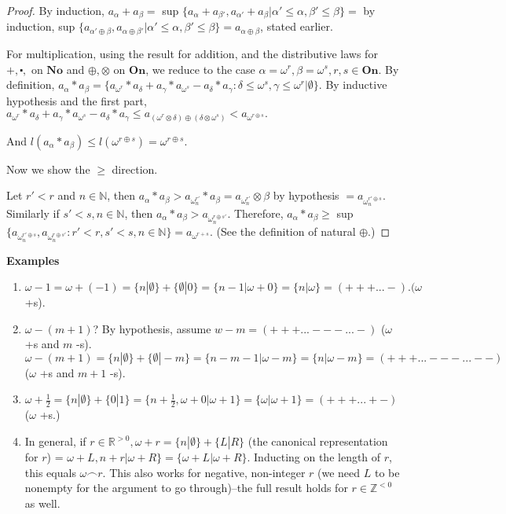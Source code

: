 \begin{proof} %

By induction, $a_\alpha + a_\beta =$ sup $\{a_\alpha + a_{\beta'}, a_{\alpha'} + a_\beta | \alpha' \leq \alpha, \beta' \leq \beta \}  =$ by induction, sup $\{a_{\alpha' \oplus \beta}, a_{\alpha \oplus \beta'} | \alpha' \leq \alpha, \beta' \leq \beta \} = a_{\alpha \oplus \beta}$, stated earlier.

For multiplication, using the result for addition, and the distributive laws for $+, \centerdot,$ on $\mathbf{No}$ and $\oplus, \otimes$ on $\mathbf{On}$, we reduce to the case $\alpha = \omega^r, \beta= \omega^s, r, s \in \mathbf{On}$. By definition, $a_\alpha * a_\beta = \{a_{\omega^r} * a_\delta + a_{\gamma}*a_{\omega^s} - a_{\delta}*a_{\gamma} : \delta \leq \omega^s, \gamma \leq \omega^r | \emptyset \}.$ %
By inductive hypothesis and the first part, $a_{\omega^r} * a_\delta + a_{\gamma}*a_{\omega^s} - a_{\delta}*a_{\gamma} \leq a_{(\omega^r \otimes \delta) \oplus (\delta \otimes \omega^s)} < a_{\omega^{r \oplus s}}.$

And $l(a_\alpha * a_\beta) \leq l(\omega^{r \oplus s}) = \omega^{r \oplus s}$.

Now we show the $\geq$ direction.

Let $r'<r$ and $n \in \mathbb{N}$, then $a_\alpha * a_\beta > a_{\omega^{r'}_n} * a_{\beta}=a_{\omega^{r'}_n} \otimes \beta$ by hypothesis $=a_{\omega^{r' \oplus s}_n}$. Similarly if $s'<s, n \in \mathbb{N}$, then $a_\alpha * a_\beta > a_{\omega^{r \oplus s'}_n}$. Therefore, $a_\alpha * a_\beta \geq$ sup $\{a_{\omega^{r' \oplus s}_n}, a_{\omega^{r \oplus s'}_n}  : r' <r, s' <s, n \in \mathbb{N} \} = a_{\omega^{r+s}}$. (See the definition of natural $\oplus$.)
 \end{proof}

\textbf{Examples}

\begin{enumerate}
  \item  $\omega -1 = \omega + (-1) = \{n|\emptyset \} + \{\emptyset|0\}=\{n-1|\omega + 0\}= \{n|\omega\} = (+++...-). (\omega$ +s).
  \item  $\omega - (m+1)$? By hypothesis, assume $w-m = (+++...---...-)$ ($\omega$ +s and $m$ -s). $\omega - (m+1)= \{n|\emptyset \} + \{\emptyset|-m\} = \{n-m-1|\omega -m\} = \{n|\omega-m\} = (+++...---...--)$ ($\omega$ +s and $m+1$ -s).
  \item  $\omega + \frac{1}{2} = \{n|\emptyset \} + \{0|1\} = \{n + \frac{1}{2}, \omega + 0 | \omega +1\} = \{\omega | \omega +1\}=(+++...+-)$ ($\omega$ +s.)
  \item  In general, if $r \in \mathbb{R}^{>0}, \omega + r = \{n|\emptyset \} + \{L|R\}$ (the canonical representation for $r$) = $\omega + L, n+r | \omega +R\} = \{\omega + L | \omega + R \}$. Inducting on the length of $r$, this equals $\omega \frown r$. This also works for negative, non-integer $r$ (we need $L$ to be nonempty for the argument to go through)--the full result holds for $r \in \mathbb{Z}^{<0}$ as well.
\end{enumerate}

